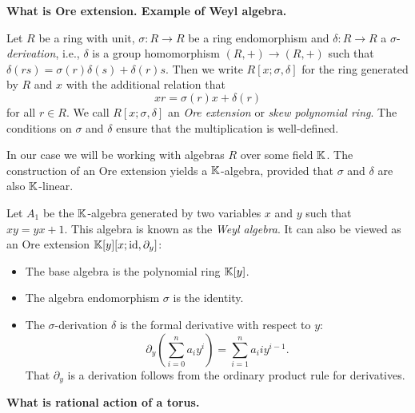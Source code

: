 \documentclass{article}
\DeclareMathOperator{\id}{id}
\begin{document}
\textbf{What is Ore extension. Example of Weyl algebra.}
\begin{definition}
	Let $R$ be a ring with unit, $\sigma \colon R \to R$ be a ring endomorphism and
	$\delta \colon R \to R$ a $\sigma$-\emph{derivation}, i.e.,
	$\delta$ is a group homomorphism $(R, +) \to (R, +)$ such that $\delta (r s) =
		\sigma(r)\delta(s) + \delta(r) s$. Then we write $R[x;\sigma, \delta]$ for the ring generated by $R$ and $x$ with the additional relation that
	\begin{equation*}
		x r = \sigma(r) x + \delta(r)
	\end{equation*}
	for all $r \in R$. We call $R[x;\sigma, \delta]$ an \emph{Ore extension} or \emph{skew polynomial ring}. The conditions on $\sigma$ and $\delta$ ensure that the multiplication is well-defined.
\end{definition}
In our case we will be working with algebras $R$ over some field $\mathbb{K}$. The construction of an Ore extension yields a $\mathbb{K}$-algebra, provided that $\sigma$ and $\delta$ are also $\mathbb{K}$-linear.
\begin{example}
	Let $A_1$ be the $\mathbb{K}$-algebra generated by two variables $x$ and $y$ such that $xy =
		yx + 1$. This algebra is known as the \emph{Weyl algebra}. It can
	also be viewed as an Ore extension $\bbK[y][x; \id, \partial_y]$:
	\begin{itemize}
		\item The base algebra is the polynomial ring $\mathbb{K}[y]$.
		\item The algebra endomorphism $\sigma$ is the identity.
		\item The $\sigma$-derivation $\delta$ is the formal derivative with respect to $y$:
		      \begin{equation*}
			      \partial_y \left(\sum_{i=0}^n a_i y^i \right) = \sum_{i=1}^{n} a_i i y^{i-1}.
		      \end{equation*}
		      That $\partial_y$ is a derivation follows from the ordinary product rule for derivatives.
	\end{itemize}
\end{example}

\textbf{What is rational action of a torus.}
\end{document}
